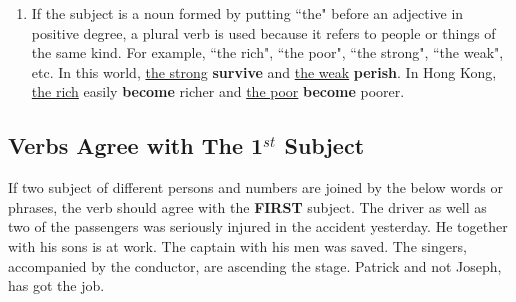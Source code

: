 \begin{enumerate}
        {\it
        The subject is a countable noun in plural number.
        }
        \newline
        \newline
        \underline{All the oranges} \textbf{are} sour.
        \newline
        \newline
        \underline{The chairs} \textbf{have} already been removed.
    \item
        {If the subject is a noun formed by putting ``the" before an adjective
        in positive degree, a plural verb is used because it refers to people or
        things of the same kind.
        }
        \newline
        \newline
        For example, ``the rich", ``the poor", ``the strong", ``the weak", etc.
        \newline
        \newline
        In this world, \underline{the strong} \textbf{survive} and
        \underline{the weak} \textbf{perish}.
        \newline
        \newline
        In Hong Kong, \underline{the rich} easily \textbf{become} richer and
        \underline{the poor} \textbf{become} poorer.
\end{enumerate}

\subsection{Verbs Agree with The 1$^{st}$ Subject}
If two subject of different persons and numbers are joined by the below words or
phrases, the verb should agree with the \textbf{FIRST} subject.
\newline
\newline
{\centering
{}
}
\newline
\newline
The driver as well as two of the passengers was seriously injured in the
accident yesterday.
\newline
\newline
He together with his sons is at work.
\newline
\newline
The captain with his men was saved.
\newline
\newline
The singers, accompanied by the conductor, are ascending the stage.
\newline
\newline
Patrick and not Joseph, has got the job.


